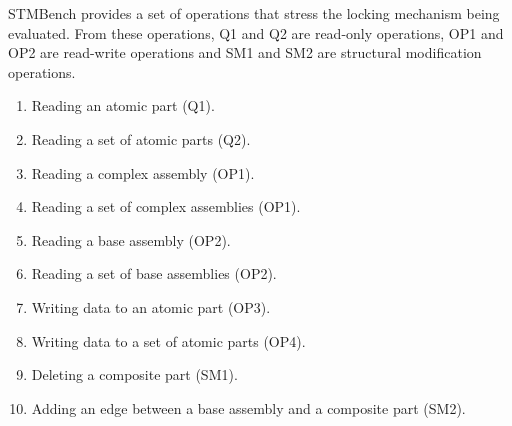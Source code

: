 STMBench provides a set of operations that stress the locking mechanism being evaluated. From these operations, Q1 and Q2 are read-only operations, OP1 and OP2 are read-write operations and SM1 and SM2 are structural modification operations.
\begin{enumerate}
	\item Reading an atomic part (Q1).
	\item Reading a set of atomic parts (Q2).
	\item Reading a complex assembly (OP1).
	\item Reading a set of complex assemblies (OP1).
	\item Reading a base assembly (OP2).
	\item Reading a set of base assemblies (OP2).
	\item Writing data to an atomic part (OP3).
	\item Writing data to a set of atomic parts (OP4).
	\item Deleting a composite part (SM1).
	\item Adding an edge between a base assembly and a composite part (SM2).
\end{enumerate}



